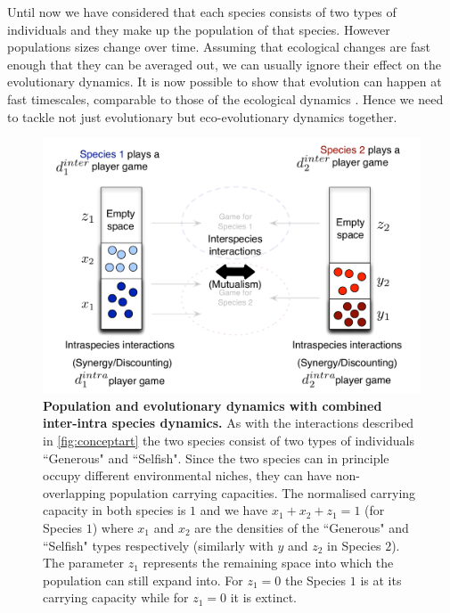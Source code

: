 \documentclass[12pt]{article}
\begin{document}
Until now we have considered that each species consists of two types of individuals and they make up the population of that species.
However populations sizes change over time. 
Assuming that ecological changes are fast enough that they can be averaged out, we can usually ignore their effect on the evolutionary dynamics.
It is now possible to show that evolution can happen at fast timescales, comparable to those of the ecological dynamics \citep{post:PTRSB:2009,beaumont:Nature:2009,hanski:PNAS:2011,sanchez:PLoSB:2013}.
Hence we need to tackle not just evolutionary but eco-evolutionary dynamics together.
%
\begin{figure}
\begin{center}
\includegraphics[scale=0.5]{../Figures/popdyninterintra.pdf}
\caption{\small{
\textbf{Population and evolutionary dynamics with combined inter-intra species dynamics.}
As with the interactions described in \ref{fig:conceptart} the two species consist of two types of individuals ``Generous" and ``Selfish".
Since the two species can in principle occupy different environmental niches, they  can have non-overlapping population carrying capacities.
The normalised carrying capacity in both species is $1$ and we have $x_1 + x_2 + z_1 = 1$ (for Species $1$) where $x_1$ and $x_2$ are the densities of the ``Generous" and ``Selfish" types respectively (similarly with $y$ and $z_2$ in Species $2$). 
The parameter $z_1$ represents the remaining space into which the population can still expand into.
For $z_1 = 0$ the Species $1$ is at its carrying capacity while for $z_1 = 0$ it is extinct.}
\label{fig:conceptartpopdyn}
}
\end{center}
\end{figure}
%
\end{document}
